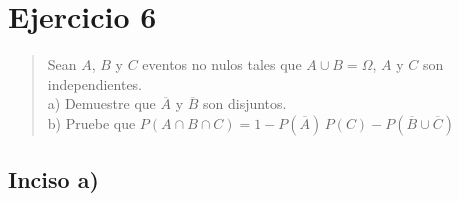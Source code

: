 \documentclass[11pt]{article}
\begin{document}
\section*{Ejercicio 6}

\begin{quote}
Sean $A$, $B$ y $C$ eventos no nulos tales que $A\cup B=\Omega$, $A$ y $C$ son independientes.\\[4pt]
a) Demuestre que $\overline{A}$ y $\overline{B}$ son disjuntos.\\
b) Pruebe que $P(A\cap B\cap C)=1-P(\overline{A})\,P(C)-P(\overline{B}\cup\overline{C})$
\end{quote}

\subsection*{Inciso a)}
\end{document}
